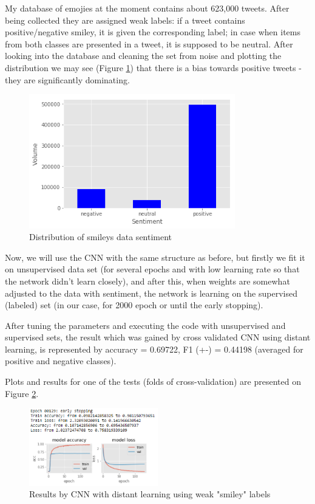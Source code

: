 \documentclass[12pt,a4paper]{article}
\begin{document}
My database of emojies at the moment contains about 623,000 tweets. After being collected they are assigned weak labels: if a tweet contains positive/negative smiley, it is given the corresponding label; in case when items from both classes are presented in a tweet, it is supposed to be neutral. After looking into the database and cleaning the set from noise and plotting the distribution we may see (Figure \ref{fig:smileys_distr}) that there is a bias towards positive tweets - they are significantly dominating.
\newline
\begin{figure}
\centering
\includegraphics[width=0.8\textwidth]{figures/smileys_distr.PNG}
\caption{Distribution of smileys data sentiment}
\label{fig:smileys_distr}
\end{figure}

Now, we will use the CNN with the same structure as before, but firstly we fit it on unsupervised data set (for several epochs and with low learning rate so that the network didn't learn closely), and after this, when weights are somewhat adjusted to the data with sentiment, the network is learning on the supervised (labeled) set (in our case, for 2000 epoch or until the early stopping).

After tuning the parameters and executing the code with unsupervised and supervised sets, the result which was gained by cross validated CNN using distant learning, is represented by accuracy = 0.69722, F1 (+-) =  0.44198 (averaged for positive and negative classes).

Plots and results for one of the tests (folds of cross-validation) are presented on Figure \ref{fig:results_cnn_dist}.
\newline
\begin{figure}
\centering
\includegraphics[width=0.5\textwidth]{figures/results_cnn_dist.PNG}
\caption{Results by CNN with distant learning using weak "smiley" labels}
\label{fig:results_cnn_dist}
\end{figure}
\end{document}
